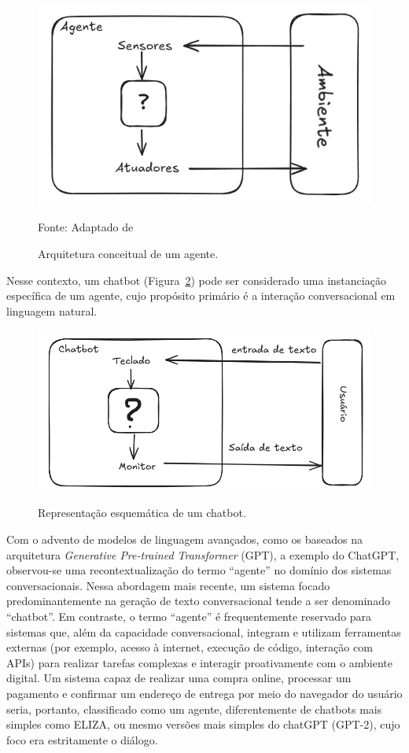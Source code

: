 \documentclass[14pt,a4paper,oneside]{book}
\begin{document}
\begin{figure}
	\centering
	\caption{Arquitetura conceitual de um agente.}
	\includegraphics[width=0.7\linewidth]{./fig/original_agente.png}
	\label{fig:agente}
	{\footnotesize \centering

		Fonte: Adaptado de \cite{Russel2013}}
\end{figure}

Nesse contexto, um chatbot (Figura~\ref{fig:chatbot}) pode ser considerado uma instanciação específica de um agente, cujo propósito primário é a interação conversacional em linguagem natural.

\begin{figure}
	\centering
	\caption{Representação esquemática de um chatbot.}
	\includegraphics[width=0.7\linewidth]{./fig/chatbot.png}
	\label{fig:chatbot}

\end{figure}

Com o advento de modelos de linguagem avançados, como os baseados na arquitetura \textit{Generative Pre-trained Transformer} (GPT), a exemplo do ChatGPT, observou-se uma recontextualização do termo ``agente'' no domínio dos sistemas conversacionais. Nessa abordagem mais recente, um sistema focado predominantemente na geração de texto conversacional tende a ser denominado ``chatbot''. 
Em contraste, o termo ``agente'' é frequentemente reservado para sistemas que, além da capacidade conversacional, integram e utilizam ferramentas externas (por exemplo, acesso à internet, execução de código, interação com APIs) para realizar tarefas complexas e interagir proativamente com o ambiente digital. 
Um sistema capaz de realizar uma compra online, processar um pagamento e confirmar um endereço de entrega por meio do navegador do usuário seria, portanto, classificado como um agente, diferentemente de chatbots mais simples como ELIZA, ou mesmo versões mais simples do chatGPT (GPT-2), cujo foco era estritamente o diálogo.
\end{document}
